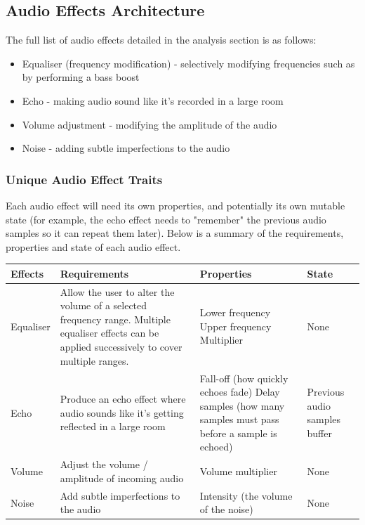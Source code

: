 \pagebreak
\subsection{Audio Effects Architecture}
The full list of audio effects detailed in the analysis section is as follows:
\begin{itemize}
	\item Equaliser (frequency modification) - selectively modifying frequencies such as by performing a bass boost
	\item Echo - making audio sound like it's recorded in a large room
	\item Volume adjustment - modifying the amplitude of the audio
	\item Noise - adding subtle imperfections to the audio
\end{itemize}

\subsubsection{Unique Audio Effect Traits}
Each audio effect will need its own properties, and potentially its own mutable state (for example, the echo effect needs to "remember" the previous audio samples so it can repeat them later). Below is a summary of the requirements, properties and state of each audio effect.

{
\renewcommand{\arraystretch}{1.5}
\begin{table}[h!]
	\begin{center}
		\begin{tabularx}{1.0 \textwidth} {
				| >{\raggedright\arraybackslash}X 
				| >{\raggedright\arraybackslash}X
				| >{\raggedright\arraybackslash}X 
				| >{\raggedright\arraybackslash}X  |
			}
			\hline
			Effects & Requirements & Properties & State \\
			
			\hline
			Equaliser & Allow the user to alter the volume of a selected frequency range. Multiple equaliser effects can be applied successively to cover multiple ranges.  & Lower frequency \newline  Upper frequency \newline Multiplier  & None \\
			
			\hline
			Echo & Produce an echo effect where audio sounds like it's getting reflected in a large room & Fall-off (how quickly echoes fade) \newline Delay samples (how many samples must pass before a sample is echoed) & Previous audio samples buffer \\
			
			\hline
			Volume & Adjust the volume / amplitude of incoming audio & Volume multiplier & None \\
			
			\hline
			Noise & Add subtle imperfections to the audio & Intensity (the volume of the noise) & None\\
			
			\hline
		\end{tabularx}
	\end{center}
\end{table}
}

